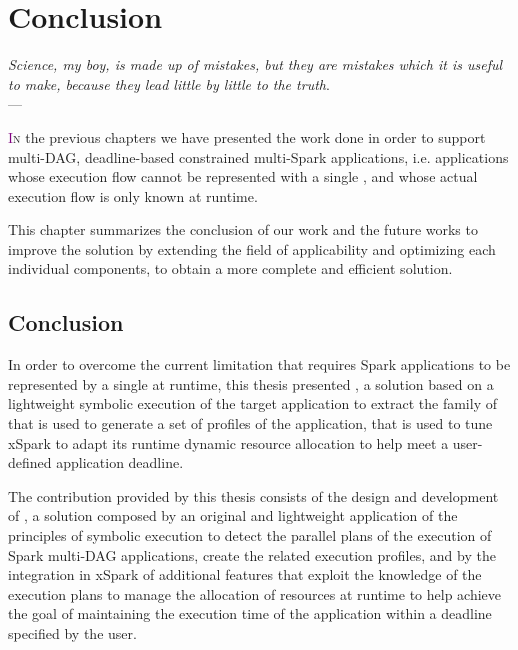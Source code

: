 \chapter{Conclusion} \label{chap:conclusion}
\begin{flushright}{\slshape    
   Science, my boy, is made up of mistakes, but they are mistakes
   which it is useful to make, because they lead little by little
   to the truth}. \\ \medskip --- \citeauthor{verne_journey:1957}
    \citeyear{verne_journey:1957}
\end{flushright} 
\lettrine[lines=4]{\textcolor{purple}{I}}{n} the previous chapters we have presented the work done in order to support multi-DAG, deadline-based \qos constrained multi-\plans Spark applications, i.e. applications whose execution flow cannot be represented with a single \plan, and whose actual execution flow is only known at runtime. 

This chapter summarizes the conclusion of our work and the future works to improve the solution by extending the field of applicability and optimizing each  individual components, to obtain a more complete and efficient solution.

\section{Conclusion}\label{sec:conclusion}

In order to overcome the current limitation that requires Spark applications to be represented by a single \plan at runtime, this thesis presented \dSymb, a solution based on a lightweight symbolic execution of the target application to extract the family of \plans that is used to generate a set of profiles of the application, that is used to tune xSpark to adapt its runtime dynamic resource allocation to help meet a user-defined application deadline.

The contribution provided by this thesis consists of the design and development of \tool, a  solution composed by an original and lightweight application of the principles of symbolic execution to detect the parallel plans of the execution of Spark multi-DAG applications, create the related execution profiles, and by the integration in xSpark of additional features that exploit the knowledge of the execution plans to manage the allocation of resources at runtime to help achieve the goal of maintaining the execution time of the application within a deadline specified by the user.

